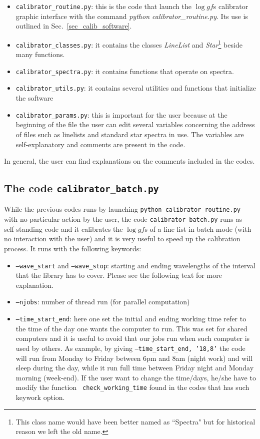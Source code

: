 \documentclass[a4paper,10pt]{article}
\newcommand\loggf{$\log gf$}
\begin{document}
\begin{itemize}
%
\item {\tt calibrator\_routine.py}: this is the code that launch the \loggf s
calibrator graphic interface with the command {\em python
calibrator\_routine.py}. Its use is outlined in
Sec.~\ref{sec_calib_software}.
%
\item {\tt calibrator\_classes.py}: it contains the classes {\em LineList}
and {\em Star}\footnote{ This class name would have been better named 
as ``Spectra" but for historical reason we left the old name.} beside many
functions.
%
\item {\tt calibrator\_spectra.py}: it contains functions that operate on
spectra.
%
\item {\tt calibrator\_utils.py}: it contains several utilities and functions
that initialize the software
%
\item {\tt calibrator\_params.py}: this is important for the user because at
the beginning of the file the user can edit several variables concerning the
address of files such as linelists and standard star spectra in use. The
variables are self-explanatory and comments are present in the code.
%
\end{itemize}

In general, the user can find explanations on the comments included in the
codes.

\subsection{The code {\tt calibrator\_batch.py}}

While the previous codes runs by launching {\tt python calibrator\_routine.py}
with no particular action by the user, the code {\tt calibrator\_batch.py}
runs as self-standing code and it calibrates the \loggf s of a line list in
batch mode (with no interaction with the user) and it is very useful to
speed up the calibration process. It runs with the following keywords:\\

\begin{itemize}
%
\item {\tt --wave\_start} and {\tt --wave\_stop}: starting and ending wavelengths
of the interval that the library has to cover. Please see the following text
for more explanation.
%
\item {\tt --njobs}: number of thread run (for parallel computation)
%
\item {\tt --time\_start\_end}: here one set the initial and ending working 
time refer to the time of the day one wants
the computer to run. This was set for shared computers and it is useful to 
avoid that our jobs run when such computer is used by others. As example, by
giving {\tt --time\_start\_end, '18,8'} the code will run from Monday to Friday
between 6pm and 8am (night work) and will sleep during the day, while it run
full time between Friday night and Monday morning (week-end). If the user
want to change the time/days, he/she have to modify the function {\tt
check\_working\_time} found in the codes that has such keywork option.\\
%
\end{itemize}
\end{document}

